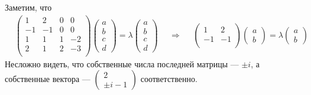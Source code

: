 \documentclass[12pt,a4paper]{article}
\begin{document}
    \begin{enumproblem}
        Заметим, что
        \begin{align*}
            &\begin{pmatrix}
                1& 2& 0& 0\\
                -1& -1& 0& 0\\
                1& 1& 1& -2\\
                2& 1& 2& -3\\
            \end{pmatrix}
            \begin{pmatrix}
                a\\
                b\\
                c\\
                d
            \end{pmatrix}
            =
            \lambda
            \begin{pmatrix}
                a\\
                b\\
                c\\
                d
            \end{pmatrix}&
            &\Longrightarrow&
            &\begin{pmatrix}
                1& 2\\
                -1& -1\\
            \end{pmatrix}
            \begin{pmatrix}
                a\\
                b
            \end{pmatrix}
            =
            \lambda
            \begin{pmatrix}
                a\\
                b
            \end{pmatrix}
        \end{align*}
        Несложно видеть, что собственные числа последней матрицы --- $\pm i$, а собственные вектора --- $(\begin{smallmatrix}
            2\\
            \pm i - 1
        \end{smallmatrix})$ соответственно.


\end{enumproblem}
\end{document}
